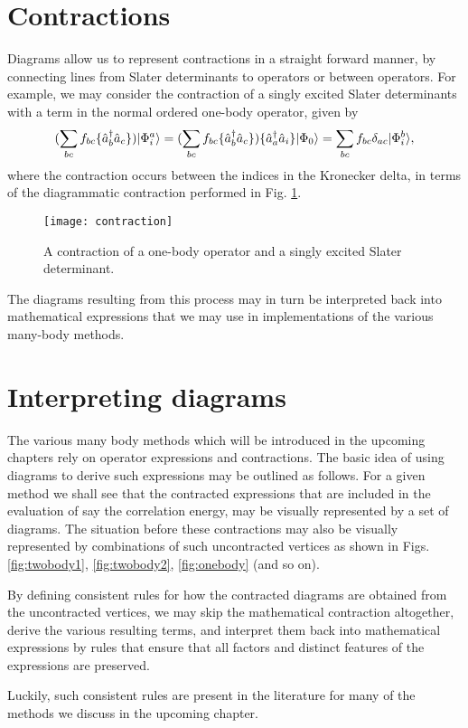 \FloatBarrier

\section{Contractions}

Diagrams allow us to represent contractions in a straight
forward manner, by connecting lines from Slater determinants to operators or between
operators. For example, we may consider the contraction of a singly
excited Slater determinants with a term in the normal ordered one-body operator, given by 
\begin{equation}
( \sum_{bc} f_{bc} \{  \Cr{b} \An{c} \}) \vert \Phi_i^a \rangle = ( \sum_{bc} f_{bc} \{ \Cr{b} \An{c} \})\{ \Cr{a} \An{i} \} \vert \Phi_0 \rangle = \sum_{bc} f_{bc} \delta_{ac}  \vert \Phi_i^b \rangle,
\label{eqn:onebody_N1}
\end{equation}
where the contraction occurs between the indices in the Kronecker delta, in terms of the  diagrammatic contraction 
performed in Fig. \ref{fig:contraction}.

\begin{figure}[hbtp]
    \centering
    \texttt{[image: contraction]}
    \caption{A contraction of a one-body operator and a singly excited Slater determinant.}
    \label{fig:contraction}
\end{figure}

The diagrams resulting from this process may in turn be interpreted
back into mathematical expressions that we may use in implementations
of the various many-body methods.


\section{Interpreting diagrams}

The various many body methods which will be introduced in the upcoming
chapters rely on operator expressions and contractions. The basic idea
of using diagrams to derive such expressions may be outlined as
follows. For a given method we shall see that the contracted
expressions that are included in the  evaluation of say the correlation energy, may
be visually represented by a set of diagrams. The situation before
these contractions may also be visually represented by combinations of
such uncontracted vertices as shown in Figs. \ref{fig:twobody1}, \ref{fig:twobody2}, \ref{fig:onebody} (and so on). 

By defining consistent
rules for how the contracted diagrams are obtained from the
uncontracted vertices, we may skip the mathematical contraction
altogether, derive the various resulting terms, and interpret them
back into mathematical expressions by rules that ensure that all
factors and distinct features of the expressions are preserved.

Luckily, such consistent rules are present in the literature
\cite{ShavittBartlett2009} for many of the methods we discuss in the
upcoming chapter.
